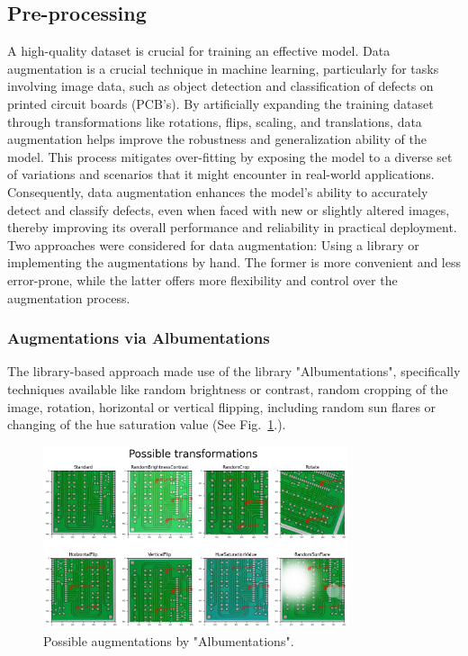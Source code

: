 \documentclass[12pt]{article}
\begin{document}
\subsection{Pre-processing}
A high-quality dataset is crucial for training an effective model. Data augmentation is a crucial technique in machine learning, 
particularly for tasks involving image data, such as object detection and classification of defects on printed circuit boards (PCB's). 
By artificially expanding the training dataset through transformations like rotations, flips, scaling, and translations, data augmentation 
helps improve the robustness and generalization ability of the model. This process mitigates over-fitting by exposing the model to a diverse 
set of variations and scenarios that it might encounter in real-world applications. Consequently, data augmentation enhances the model's 
ability to accurately detect and classify defects, even when faced with new or slightly altered images, thereby improving its overall 
performance and reliability in practical deployment.
Two approaches were considered for data augmentation: Using a library or implementing the augmentations by hand. The former is more convenient and less error-prone, while the latter offers more flexibility and control over the augmentation process. 

\subsubsection{Augmentations via Albumentations}

The library-based approach made use of the library "Albumentations", specifically techniques available like random brightness or contrast, random cropping of the image, rotation, horizontal or vertical flipping, including random sun flares or changing of the hue saturation value (See Fig.~\ref{fig:Albumentations}.).

\begin{figure}[h]
    \centering
    \includegraphics[width=0.8\textwidth]{./graphics/5.png}
    \caption{Possible augmentations by "Albumentations".}
    \label{fig:Albumentations}
\end{figure}
\end{document}
